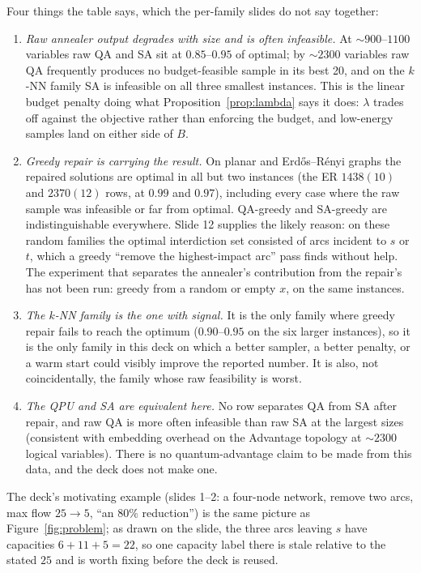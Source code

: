 \documentclass[11pt]{article}
\begin{document}
Four things the table says, which the per-family slides do not say together:
\begin{enumerate}[leftmargin=1.5em]
\item \emph{Raw annealer output degrades with size and is often infeasible.} At $\sim 900$--$1100$ variables raw QA and SA sit at $0.85$--$0.95$ of optimal; by $\sim 2300$ variables raw QA frequently produces no budget-feasible sample in its best 20, and on the $k$-NN family SA is infeasible on all three smallest instances. This is the linear budget penalty doing what Proposition~\ref{prop:lambda} says it does: $\lambda$ trades off against the objective rather than enforcing the budget, and low-energy samples land on either side of $B$.
\item \emph{Greedy repair is carrying the result.} On planar and Erd\H{o}s--R\'enyi graphs the repaired solutions are optimal in all but two instances (the ER $1438(10)$ and $2370(12)$ rows, at $0.99$ and $0.97$), including every case where the raw sample was infeasible or far from optimal. QA-greedy and SA-greedy are indistinguishable everywhere. Slide 12 supplies the likely reason: on these random families the optimal interdiction set consisted of arcs incident to $s$ or $t$, which a greedy ``remove the highest-impact arc'' pass finds without help. The experiment that separates the annealer's contribution from the repair's has not been run: greedy from a random or empty $x$, on the same instances.
\item \emph{The $k$-NN family is the one with signal.} It is the only family where greedy repair fails to reach the optimum ($0.90$--$0.95$ on the six larger instances), so it is the only family in this deck on which a better sampler, a better penalty, or a warm start could visibly improve the reported number. It is also, not coincidentally, the family whose raw feasibility is worst.
\item \emph{The QPU and SA are equivalent here.} No row separates QA from SA after repair, and raw QA is more often infeasible than raw SA at the largest sizes (consistent with embedding overhead on the Advantage topology at $\sim 2300$ logical variables). There is no quantum-advantage claim to be made from this data, and the deck does not make one.
\end{enumerate}

The deck's motivating example (slides 1--2: a four-node network, remove two arcs, max flow $25 \to 5$, ``an $80\%$ reduction'') is the same picture as Figure~\ref{fig:problem}; as drawn on the slide, the three arcs leaving $s$ have capacities $6+11+5=22$, so one capacity label there is stale relative to the stated $25$ and is worth fixing before the deck is reused.
\end{document}
